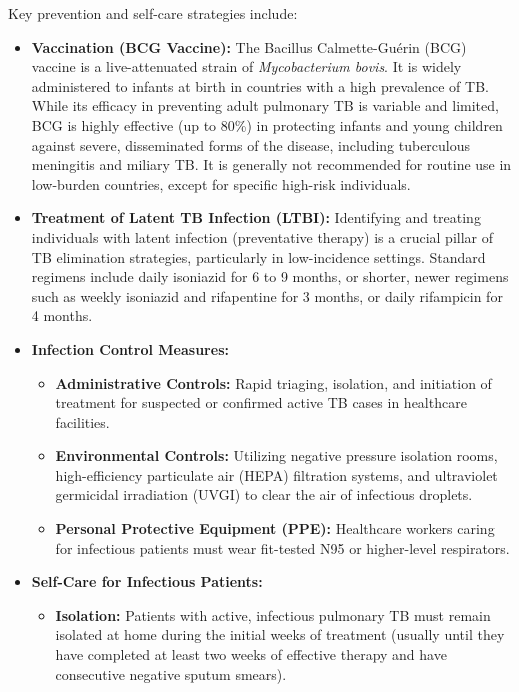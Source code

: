 Key prevention and self-care strategies include:

\begin{itemize}
    \item \textbf{Vaccination (BCG Vaccine):} The Bacillus Calmette-Gu\'{e}rin (BCG) vaccine is a live-attenuated strain of \textit{Mycobacterium bovis}. It is widely administered to infants at birth in countries with a high prevalence of TB. While its efficacy in preventing adult pulmonary TB is variable and limited, BCG is highly effective (up to 80\%) in protecting infants and young children against severe, disseminated forms of the disease, including tuberculous meningitis and miliary TB. It is generally not recommended for routine use in low-burden countries, except for specific high-risk individuals.
    \item \textbf{Treatment of Latent TB Infection (LTBI):} Identifying and treating individuals with latent infection (preventative therapy) is a crucial pillar of TB elimination strategies, particularly in low-incidence settings. Standard regimens include daily isoniazid for 6 to 9 months, or shorter, newer regimens such as weekly isoniazid and rifapentine for 3 months, or daily rifampicin for 4 months.
    \item \textbf{Infection Control Measures:}
    \begin{itemize}
        \item \textbf{Administrative Controls:} Rapid triaging, isolation, and initiation of treatment for suspected or confirmed active TB cases in healthcare facilities.
        \item \textbf{Environmental Controls:} Utilizing negative pressure isolation rooms, high-efficiency particulate air (HEPA) filtration systems, and ultraviolet germicidal irradiation (UVGI) to clear the air of infectious droplets.
        \item \textbf{Personal Protective Equipment (PPE):} Healthcare workers caring for infectious patients must wear fit-tested N95 or higher-level respirators.
    \end{itemize}
    \item \textbf{Self-Care for Infectious Patients:}
    \begin{itemize}
        \item \textbf{Isolation:} Patients with active, infectious pulmonary TB must remain isolated at home during the initial weeks of treatment (usually until they have completed at least two weeks of effective therapy and have consecutive negative sputum smears).

\end{itemize}
\end{itemize}
